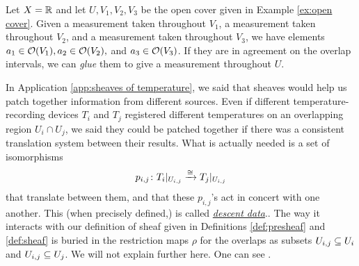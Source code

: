 \documentclass[CT4S-EN-RU]{subfiles}
\begin{document}
\begin{example}

Let $X=\RR$ and let $U, V_1,V_2,V_3$ be the open cover given in Example \ref{ex:open cover}. Given a measurement taken throughout $V_1$, a measurement taken throughout $V_2$, and a measurement taken throughout $V_3$, we have elements $a_1\in\mcO(V_1), a_2\in\mcO(V_2),$ and $a_3\in\mcO(V_3)$. If they are in agreement on the overlap intervals, we can {\em glue}  them to give a measurement throughout $U$.

\end{example}

\begin{remark}

In Application \ref{app:sheaves of temperature}, we said that sheaves would help us patch together information from different sources. Even if different temperature-recording devices $T_i$ and $T_j$ registered different temperatures on an overlapping region $U_i\cap U_j$, we said they could be patched together if there was a consistent translation system between their results. What is actually needed is a set of isomorphisms 
$$p_{i,j}\taking T_i|_{U_{i,j}}\To{\iso} T_j|_{U_{i,j}}$$ 
that translate between them, and that these $p_{i,j}$'s act in concert with one another. This (when precisely defined,) is called \href{http://en.wikipedia.org/wiki/Descent_theory}{\em descent data}.. The way it interacts with our definition of sheaf given in Definitions \ref{def:presheaf} and \ref{def:sheaf} is buried in the restriction maps $\rho$ for the overlaps as subsets $U_{i,j}\ss U_i$ and $U_{i,j}\ss U_j$. We will not explain further here. One can see \cite{Gro}.

\end{remark}
\end{document}
